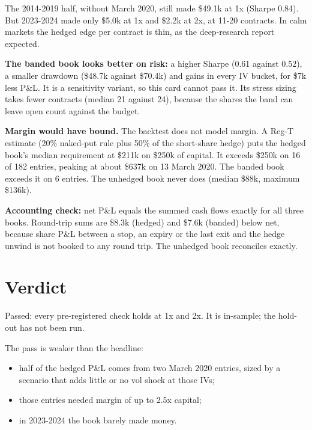 \documentclass{article}
\begin{document}
The 2014-2019 half, without March 2020, still made \$49.1k at 1x (Sharpe 0.84). But 2023-2024 made only \$5.0k at 1x and \$2.2k at 2x, at 11-20 contracts. In calm markets the hedged edge per contract is thin, as the deep-research report expected.

\textbf{The banded book looks better on risk:} a higher Sharpe (0.61 against 0.52), a smaller drawdown (\$48.7k against \$70.4k) and gains in every IV bucket, for \$7k less P\&L. It is a sensitivity variant, so this card cannot pass it. Its stress sizing takes fewer contracts (median 21 against 24), because the shares the band can leave open count against the budget.

\textbf{Margin would have bound.} The backtest does not model margin. A Reg-T estimate (20\% naked-put rule plus 50\% of the short-share hedge) puts the hedged book's median requirement at \$211k on \$250k of capital. It exceeds \$250k on 16 of 182 entries, peaking at about \$637k on 13 March 2020. The banded book exceeds it on 6 entries. The unhedged book never does (median \$88k, maximum \$136k).

\textbf{Accounting check:} net P\&L equals the summed cash flows exactly for all three books. Round-trip sums are \$8.3k (hedged) and \$7.6k (banded) below net, because share P\&L between a stop, an expiry or the last exit and the hedge unwind is not booked to any round trip. The unhedged book reconciles exactly.

\section{Verdict}

Passed: every pre-registered check holds at 1x and 2x. It is in-sample; the hold-out has not been run.

The pass is weaker than the headline:

\begin{itemize}

\item half of the hedged P\&L comes from two March 2020 entries, sized by a scenario that adds little or no vol shock at those IVs;

\item those entries needed margin of up to 2.5x capital;

\item in 2023-2024 the book barely made money.

\end{itemize}
\end{document}
